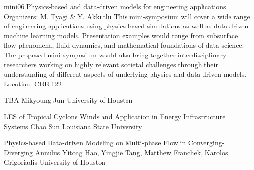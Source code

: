 \mini
{mini06}
{Physics-based and data-driven models for engineering applications}
{Organizers: M. Tyagi \& Y. Akkutlu}
{This mini-symposium will cover a wide range of engineering applications using physics-based simulations as well as data-driven machine learning models. Presentation examples would range from subsurface flow phenomena, fluid dynamics, and mathematical foundations of data-science. The proposed mini symposium would also bring together interdisciplinary researchers working on highly relevant societal challenges through their understanding of different aspects of underlying physics and data-driven models.}
{Location: CBB 122}

\begin{talks}
\item\talk
{TBA}
{Mikyoung Jun}
{University of Houston}
\item\talk
{LES of Tropical Cyclone Winds and Application in Energy Infrastructure Systems}
{Chao Sun}
{Louisiana State University}
\item\talk
{Physics-based Data-driven Modeling on Multi-phase Flow in Converging-Diverging Annulus}
{Yitong Hao, Yingjie Tang, Matthew Franchek, Karolos Grigoriadis}
{University of Houston}
\end{talks}
\room

